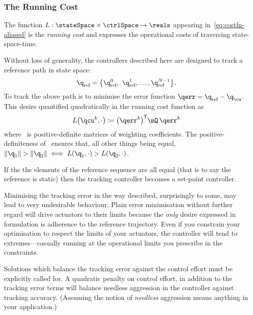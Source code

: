 \subsubsection{The Running Cost}


The function $L:\stateSpace\times\ctrlSpace\rightarrow\reals$ appearing
in~\eqref{eq:costfn-aliased} is the \emph{running cost} and
expresses the operational costs of traversing state-space-time.

Without loss of generality, the controllers described here are designed to track
a reference path in state space:
%
\begin{equation*}
  \q\rnc=\bigl\{\q\rnc^0,\ \q\rnc^1,\ldots,\q\rnc^{N-1}\bigr\}.
\end{equation*}
%
To track the above path is to minimise the error function $\qerr = \q\rnc -
\q_\cu$. This desire quantified quadratically in the
running cost function as
%
\begin{equation}\label{L-err}
  L\bigl(\qcu^k,\cdot\bigr) \coloneq \bigl(\qerr^k\bigr)\tr\mQ\,\qerr^k
\end{equation}
%
where \mQ\ is positive-definite matrices of weighting coefficients. The
positive-definiteness of \mQ\ ensures that, all other things being equal,
$\norm{\q_1} > \norm{\q_2} \iff L(\q_1,\cdot) > L(\q_2,\cdot)$.

If the the elements of the reference sequence are all equal (that is to say the
reference is static) then the tracking controller becomes a set-point
controller.

Minimising the tracking error in the way described, surprisingly to some, may
lead to very undesirable behaviour. Plain error minimisation without further
regard will drive actuators to their limits because the \emph{only} desire
expressed in formulation is adherence to the reference trajectory. Even if you
constrain your optimisation to respect the limits of your actuators, the
controller will tend to extremes—casually running at the operational limits you
prescribe in the constraints.

Solutions which balance the tracking error against the control effort must be
explicitly called for. A quadratic penalty on
control effort, in addition to the tracking error terms will balance needless
aggression in the controller against tracking accuracy. (Assuming the notion of
\emph{needless} aggression means anything in your application.)

